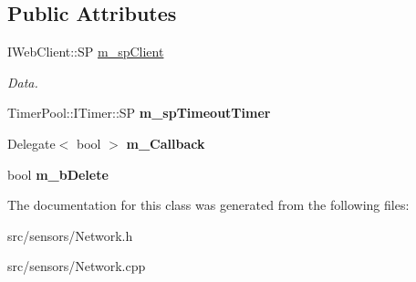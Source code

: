 \subsection*{Public Attributes}
\begin{DoxyCompactItemize}
\item 
\mbox{\label{class_network_1_1_request_afbd3e174c5741e4270698b2c4bb0d9dc}} 
I\+Web\+Client\+::\+SP \hyperlink{class_network_1_1_request_afbd3e174c5741e4270698b2c4bb0d9dc}{m\+\_\+sp\+Client}
\begin{DoxyCompactList}\small\item\em Data. \end{DoxyCompactList}\item 
\mbox{\label{class_network_1_1_request_a7a26752521e25dd0965e8d0c6208115f}} 
Timer\+Pool\+::\+I\+Timer\+::\+SP {\bfseries m\+\_\+sp\+Timeout\+Timer}
\item 
\mbox{\label{class_network_1_1_request_abb861deefd944b5bff40990830991de7}} 
Delegate$<$ bool $>$ {\bfseries m\+\_\+\+Callback}
\item 
\mbox{\label{class_network_1_1_request_a74fe85221c4cb43d74165c5c1a929d52}} 
bool {\bfseries m\+\_\+b\+Delete}
\end{DoxyCompactItemize}


The documentation for this class was generated from the following files\+:\begin{DoxyCompactItemize}
\item 
src/sensors/Network.\+h\item 
src/sensors/Network.\+cpp\end{DoxyCompactItemize}
